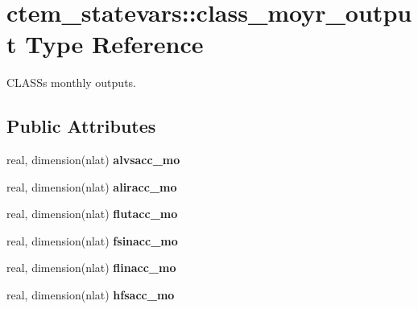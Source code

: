\hypertarget{structctem__statevars_1_1class__moyr__output}{}\section{ctem\+\_\+statevars\+:\+:class\+\_\+moyr\+\_\+output Type Reference}
\label{structctem__statevars_1_1class__moyr__output}


C\+L\+A\+S\+S\textquotesingle{}s monthly outputs.  


\subsection*{Public Attributes}
\begin{DoxyCompactItemize}
\item 
\hypertarget{structctem__statevars_1_1class__moyr__output_aebb593a4376d2394f4f65d15ea2fb37e}{}real, dimension(nlat) {\bfseries alvsacc\+\_\+mo}\label{structctem__statevars_1_1class__moyr__output_aebb593a4376d2394f4f65d15ea2fb37e}

\item 
\hypertarget{structctem__statevars_1_1class__moyr__output_abb0ed841684706d722ab398249db3ee6}{}real, dimension(nlat) {\bfseries aliracc\+\_\+mo}\label{structctem__statevars_1_1class__moyr__output_abb0ed841684706d722ab398249db3ee6}

\item 
\hypertarget{structctem__statevars_1_1class__moyr__output_a415269bb7fccdbf472f5be6e599b48ce}{}real, dimension(nlat) {\bfseries flutacc\+\_\+mo}\label{structctem__statevars_1_1class__moyr__output_a415269bb7fccdbf472f5be6e599b48ce}

\item 
\hypertarget{structctem__statevars_1_1class__moyr__output_aa845c674a29654a82d8cb89101047fb8}{}real, dimension(nlat) {\bfseries fsinacc\+\_\+mo}\label{structctem__statevars_1_1class__moyr__output_aa845c674a29654a82d8cb89101047fb8}

\item 
\hypertarget{structctem__statevars_1_1class__moyr__output_a348ed62c84b16e4c22451d2fbfcc1993}{}real, dimension(nlat) {\bfseries flinacc\+\_\+mo}\label{structctem__statevars_1_1class__moyr__output_a348ed62c84b16e4c22451d2fbfcc1993}

\item 
\hypertarget{structctem__statevars_1_1class__moyr__output_a6eb8ed35c711cf7dfe318dbf5ec4f1f1}{}real, dimension(nlat) {\bfseries hfsacc\+\_\+mo}\label{structctem__statevars_1_1class__moyr__output_a6eb8ed35c711cf7dfe318dbf5ec4f1f1}


\end{DoxyCompactItemize}
